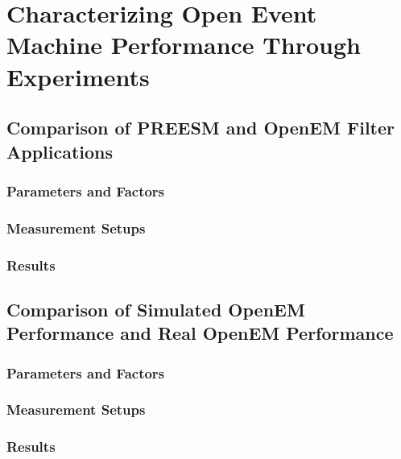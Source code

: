 \chapter{Characterizing Open Event Machine Performance Through Experiments}
\label{chapter:experiments}
\section{Comparison of PREESM and OpenEM Filter Applications}
\label{sec:firstexperiment}
\subsection{Parameters and Factors}
\subsection{Measurement Setups}
\subsection{Results}
\section{Comparison of Simulated OpenEM Performance and Real OpenEM Performance}
\label{sec:secondexperiment}
\subsection{Parameters and Factors}
\subsection{Measurement Setups}
\subsection{Results}
 
